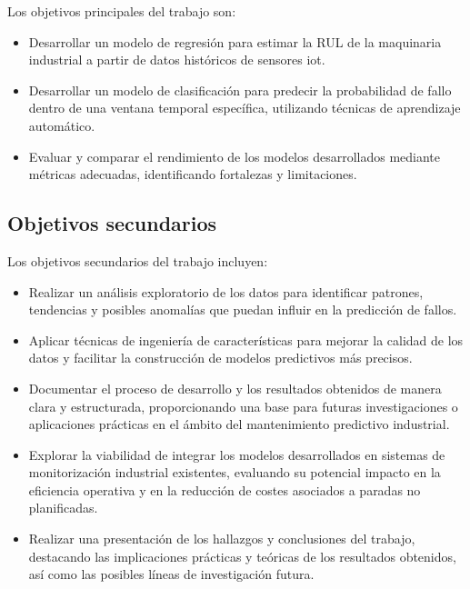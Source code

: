 \documentclass[IB]{TFUOC}
\begin{document}
Los objetivos principales del trabajo son:

\begin{itemize}
  \item Desarrollar un modelo de regresión para estimar la \gls{RUL} \cite{khvatova2022predictive} de la maquinaria
        industrial a partir de datos históricos de sensores \gls{iot}.
  \item Desarrollar un modelo de clasificación para predecir la probabilidad de fallo dentro de una ventana temporal
        específica, utilizando técnicas de aprendizaje automático.
  \item Evaluar y comparar el rendimiento de los modelos desarrollados mediante métricas adecuadas, identificando
        fortalezas y limitaciones.
\end{itemize}

\subsection{Objetivos secundarios}

Los objetivos secundarios del trabajo incluyen:

\begin{itemize}
  \item Realizar un análisis exploratorio de los datos para identificar patrones, tendencias y posibles anomalías que
        puedan influir en la predicción de fallos.
  \item Aplicar técnicas de ingeniería de características para mejorar la calidad de los datos y facilitar la
        construcción de modelos predictivos más precisos.
  \item Documentar el proceso de desarrollo y los resultados obtenidos de manera clara y estructurada, proporcionando
        una base para futuras investigaciones o aplicaciones prácticas en el ámbito del mantenimiento predictivo
        industrial.
  \item Explorar la viabilidad de integrar los modelos desarrollados en sistemas de monitorización industrial
        existentes, evaluando su potencial impacto en la eficiencia operativa y en la reducción de costes asociados a
        paradas no planificadas.
  \item Realizar una presentación de los hallazgos y conclusiones del trabajo, destacando las implicaciones prácticas y
        teóricas de los resultados obtenidos, así como las posibles líneas de investigación futura.
\end{itemize}
\end{document}
